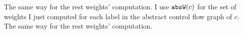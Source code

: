 The same way for the rest weights' computation.
 I use $\mathtt{abs}{\mathtt{W}}(c)$ for the set of weights I just computed 
for each label in the abstract control flow graph of $c$.
%
The same way for the rest weights' computation.
